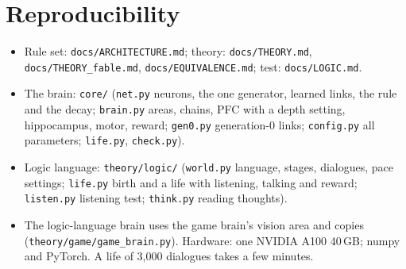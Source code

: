 \documentclass[11pt]{article}
\begin{document}
\section{Reproducibility}
\begin{itemize}
\item Rule set: \texttt{docs/ARCHITECTURE.md}; theory: \texttt{docs/THEORY.md}, \texttt{docs/THEORY\_fable.md},
\texttt{docs/EQUIVALENCE.md}; test: \texttt{docs/LOGIC.md}.
\item The brain: \texttt{core/} (\texttt{net.py} neurons, the one generator, learned links, the rule and the decay;
\texttt{brain.py} areas, chains, PFC with a depth setting, hippocampus, motor, reward; \texttt{gen0.py} generation-0
links; \texttt{config.py} all parameters; \texttt{life.py}, \texttt{check.py}).
\item Logic language: \texttt{theory/logic/} (\texttt{world.py} language, stages, dialogues,
pace settings; \texttt{life.py} birth and a life with listening, talking and reward; \texttt{listen.py} listening test;
\texttt{think.py} reading thoughts).
\item The logic-language brain uses the game brain's vision area and copies (\texttt{theory/game/game\_brain.py}).
Hardware: one NVIDIA A100 40\,GB; numpy and PyTorch. A life of 3,000 dialogues takes a few minutes.
\end{itemize}
\end{document}
